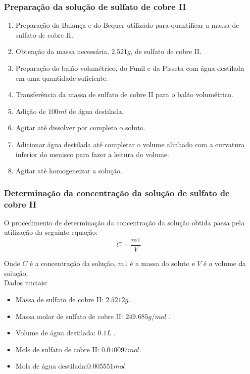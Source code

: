 \documentclass[a4paper, 11pt]{article}
\begin{document}
        \subsubsection{Preparação da solução de sulfato de cobre II}\label{sec:preparacao_solucao}
            \begin{enumerate}
                \item Preparação da Balança e do Bequer utilizado para quantificar a massa de sulfato de cobre II\@.
                \item Obtenção da massa necessária, $2.521g$, de sulfato de cobre II\@.
                \item Preparação do balão volumétrico, do Funil e da Pisseta com água destilada em uma quantidade suficiente\@.
                \item Transferência da massa de sulfato de cobre II para o balão volumétrico\@.
                \item Adição de $100ml$ de água destilada\@.
                \item Agitar até dissolver por completo o soluto\@.
                \item Adicionar água destilada até completar o volume alinhado com a curvatura inferior do menisco para fazer a leitura do volume\@.
                \item Agitar até homogeneizar a solução\@.
            \end{enumerate}
        \doublespacing

        \subsubsection{Determinação da concentração da solução de sulfato de cobre II}\label{sec:determinacao_concentracao}
        \indent O procedimento de determinação da concentração da solução obtida passa pela utilização da seguinte equação:\\
        \begin{equation}
            \label{eq:equacao_concentracao}
            C = \frac{m1}{V}
        \end{equation}

        \indent Onde $C$ é a concentração da solução, $m1$ é a massa do soluto e $V$ é o volume da solução\@.\\

        \indent Dados iniciais:
        \begin{itemize}
            \item Massa de sulfato de cobre II: $2.5212g$\@.
            \item Massa molar de sulfato de cobre II: $249.685 g/mol$ \@.
            \item Volume de água destilada: $0.1L$ \@.
            \item Mols de sulfato de cobre II: $0.010097mol$\@.
            \item Mols de água destilada:$0.005551mol$\@.
        \end{itemize}
\end{document}
